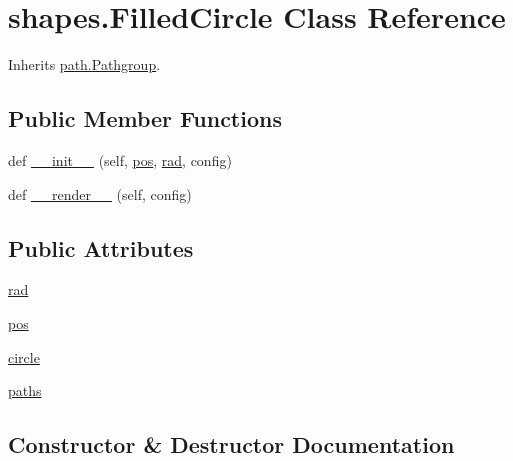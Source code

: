 \hypertarget{classshapes_1_1_filled_circle}{}\section{shapes.\+Filled\+Circle Class Reference}
\label{classshapes_1_1_filled_circle}


Inherits \hyperlink{classpath_1_1_pathgroup}{path.\+Pathgroup}.

\subsection*{Public Member Functions}
\begin{DoxyCompactItemize}
\item 
def \hyperlink{classshapes_1_1_filled_circle_a2ef7c82959da6611c35f28dc01076caa}{\+\_\+\+\_\+init\+\_\+\+\_\+} (self, \hyperlink{classshapes_1_1_filled_circle_ac694d06688a290a3931bebf794d27366}{pos}, \hyperlink{classshapes_1_1_filled_circle_acf773eb81f9e81aabbc1877ad62a1c06}{rad}, config)
\item 
def \hyperlink{classshapes_1_1_filled_circle_a8abe52dcba99352c72cc42dc0fe4a3e2}{\+\_\+\+\_\+render\+\_\+\+\_\+} (self, config)
\end{DoxyCompactItemize}
\subsection*{Public Attributes}
\begin{DoxyCompactItemize}
\item 
\hyperlink{classshapes_1_1_filled_circle_acf773eb81f9e81aabbc1877ad62a1c06}{rad}
\item 
\hyperlink{classshapes_1_1_filled_circle_ac694d06688a290a3931bebf794d27366}{pos}
\item 
\hyperlink{classshapes_1_1_filled_circle_a75282e0e0fadfe3ad1bd53fe0cba6568}{circle}
\item 
\hyperlink{classshapes_1_1_filled_circle_acefd4214639d5c1a8c82efab2bcca410}{paths}
\end{DoxyCompactItemize}


\subsection{Constructor \& Destructor Documentation}
\hypertarget{classshapes_1_1_filled_circle_a2ef7c82959da6611c35f28dc01076caa}{}
